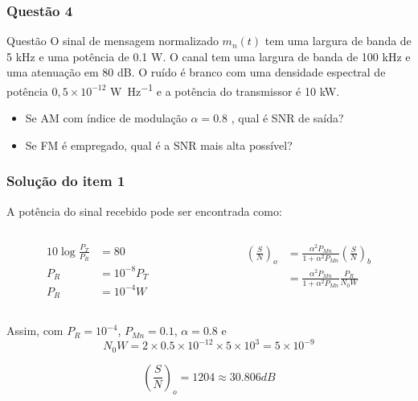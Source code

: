 \documentclass[aspectratio=169,dvipsnames]{beamer}
\begin{document}
\begin{frame}
  \frametitle{Questão 4}

  \begin{block}{Questão}
    O sinal de mensagem normalizado $m_n(t)$ tem uma largura de banda de 
    5 \si{\kilo \hertz} e uma potência de 0.1 \si{\watt}. O canal tem uma largura 
    de banda de 100 \si{\kilo \hertz} e uma atenuação em 80 dB. O ruído é branco com
    uma densidade espectral de potência $0,5 \times 10^{-12}$ \si{\watt \per \hertz} e a potência do transmissor é 
    10 \si{\kilo \watt}.  

    \begin{itemize}
      \item Se AM com índice de modulação $\alpha = 0.8$ , qual é  SNR de saída?
      \item Se FM é empregado, qual é a SNR mais alta possível?
    \end{itemize}

  \end{block}
  
\end{frame}


\begin{frame}
  \frametitle{Solução do item 1}
   A potência do sinal recebido pode ser encontrada como: 
\begin{columns}[T] %
    \begin{column}{.5\textwidth} %
      \begin{align*}
      10\log{\frac{P_T}{P_R}} &= 80\\
      P_R &= 10^{-8}P_T\\
      P_R &= 10^{-4} W 
      \end{align*}
    \end{column}
    
    \begin{column}{.5\textwidth} %
      \begin{align*}
      \left(\frac{S}{N}\right)_o &= \frac{ \alpha^2 P_{Mn}}{1 + \alpha^2 P_{Mn}} \left(\frac{S}{N}\right)_b\\
      &= \frac{ \alpha^2 P_{Mn}}{1 + \alpha^2 P_{Mn}} \frac{P_R}{N_0W}
      \end{align*}
    \end{column}
\end{columns}
  

  Assim, com $P_R = 10^{-4}$, $P_{Mn} = 0.1$, $\alpha = 0.8$ e $$N_0W = 2 \times 0.5 \times 10^{-12} \times 5 \times 10^3 = 5 \times 10^{-9}$$

$$ \left(\frac{S}{N}\right)_o = 1204 \approx 30.806 dB $$

\end{frame}
\end{document}

